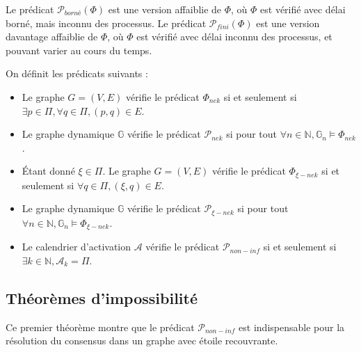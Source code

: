 \documentclass{article}
\begin{document}
Le prédicat $\mathcal{P}_{borné}(\Phi)$ est une version affaiblie de $\Phi$, où $\Phi$ est vérifié avec délai borné, mais inconnu des processus.
Le prédicat $\mathcal{P}_{fini}(\Phi)$ est une version davantage affaiblie de $\Phi$, où $\Phi$ est vérifié avec délai inconnu des processus, et pouvant varier au cours du temps.

On définit les prédicats suivants :
\begin{itemize}
	\item Le graphe $G = (V, E)$ vérifie le prédicat $\Phi_{nek}$ si et seulement si $\exists p \in \Pi, \forall q \in \Pi, (p, q) \in E$.
	\item Le graphe dynamique $\mathds{G}$ vérifie le prédicat $\mathcal{P}_{nek}$ si pour tout $\forall n \in \mathds{N}, \mathds{G}_n \models \Phi_{nek}$. 
	\item Étant donné $\xi \in \Pi$. Le graphe $G = (V, E)$ vérifie le prédicat $\Phi_{\xi-nek}$ si et seulement si $\forall q \in \Pi, (\xi, q) \in E$.
	\item Le graphe dynamique $\mathds{G}$ vérifie le prédicat $\mathcal{P}_{\xi-nek}$ si pour tout $\forall n \in \mathds{N}, \mathds{G}_n \models \Phi_{\xi-nek}$. 
	\item Le calendrier d'activation $\mathcal{A}$ vérifie le prédicat $\mathcal{P}_{non-inf}$ si et seulement si $\exists k \in \mathds{N}, \mathcal{A}_k = \Pi$.
\end{itemize}

\subsection{Théorèmes d'impossibilité}

Ce premier théorème montre que le prédicat $\mathcal{P}_{non-inf}$ est indispensable pour la résolution du consensus dans un graphe avec étoile recouvrante.
\end{document}
